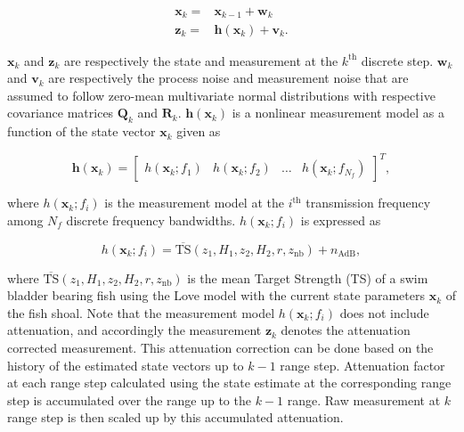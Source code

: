 \documentclass[technicalnote,oneauthor,latex,dvi2pdf,10pt,a4paper]{Definitions/mdpi}
\begin{document}
\begin{align}
\label{eq:model}
\mathbf{x}_k = & \mathbf{x}_{k-1} + \mathbf{w}_k \\ \nonumber
\mathbf{z}_k = & \mathbf{h}\left(\mathbf{x}_k\right) + \mathbf{v}_k.
\end{align}

\noindent $\mathbf{x}_k$ and $\mathbf{z}_k$ are respectively the state and measurement at the $k^\text{th}$ discrete step.
$\mathbf{w}_k$ and $\mathbf{v}_k$ are respectively the process noise and measurement noise that are assumed to follow zero-mean multivariate normal distributions with respective covariance matrices $\boldsymbol{Q}_k$ and $\boldsymbol{R}_k$.
$\mathbf{h}\left(\mathbf{x}_k\right)$ is a nonlinear measurement model as a function of the state vector $\mathbf{x}_k$ given as

\begin{equation}
\label{eq:modelMeasureVector}
\mathbf{h}\left(\mathbf{x}_k\right) = 
\begin{bmatrix}
h\left(\mathbf{x}_k;f_1\right) & h\left(\mathbf{x}_k;f_2\right) & \dots & h\left(\mathbf{x}_k;f_{N_f}\right)
\end{bmatrix}^T,
\end{equation}

\noindent where $h\left(\mathbf{x}_k;f_i\right)$ is the measurement model at the $i^\text{th}$ transmission frequency among $N_f$ discrete frequency bandwidths.
$h\left(\mathbf{x}_k;f_i\right)$ is expressed as

\begin{equation}
\label{eq:modelMeasureMember}
h\left(\mathbf{x}_k;f_i\right) = \overline{\text{TS}}\left(z_1, H_1, z_2, H_2, r, z_\text{nb}\right) + n_\text{AdB},
\end{equation}

\noindent where $\overline{\text{TS}}\left(z_1, H_1, z_2, H_2, r, z_\text{nb}\right)$ is the mean Target Strength (TS) of a swim bladder bearing fish using the Love model with the current state parameters $\mathbf{x}_k$ of the fish shoal.
Note that the measurement model $h\left(\mathbf{x}_k;f_i\right)$ does not include attenuation, and accordingly the measurement $\mathbf{z}_k$ denotes the attenuation corrected measurement.
This attenuation correction can be done based on the history of the estimated state vectors up to $k-1$ range step. 
Attenuation factor at each range step calculated using the state estimate at the corresponding range step is accumulated over the range up to the $k-1$ range.
Raw measurement at $k$ range step is then scaled up by this accumulated attenuation.
\end{document}
